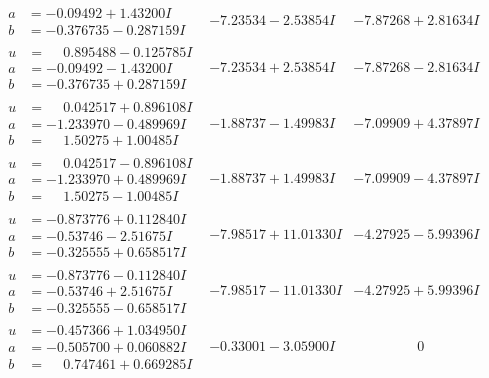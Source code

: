 \documentclass[1p]{elsarticle_modified}
\theoremstyle{definition}
\begin{document}
$$\begin{array}{c|c|c}
\begin{aligned}
a &= -0.09492 + 1.43200 I \\
b &= -0.376735 - 0.287159 I\end{aligned}
 & -7.23534 - 2.53854 I & -7.87268 + 2.81634 I \\ \hline\begin{aligned}
u &= \phantom{-}0.895488 - 0.125785 I \\
a &= -0.09492 - 1.43200 I \\
b &= -0.376735 + 0.287159 I\end{aligned}
 & -7.23534 + 2.53854 I & -7.87268 - 2.81634 I \\ \hline\begin{aligned}
u &= \phantom{-}0.042517 + 0.896108 I \\
a &= -1.233970 - 0.489969 I \\
b &= \phantom{-}1.50275 + 1.00485 I\end{aligned}
 & -1.88737 - 1.49983 I & -7.09909 + 4.37897 I \\ \hline\begin{aligned}
u &= \phantom{-}0.042517 - 0.896108 I \\
a &= -1.233970 + 0.489969 I \\
b &= \phantom{-}1.50275 - 1.00485 I\end{aligned}
 & -1.88737 + 1.49983 I & -7.09909 - 4.37897 I \\ \hline\begin{aligned}
u &= -0.873776 + 0.112840 I \\
a &= -0.53746 - 2.51675 I \\
b &= -0.325555 + 0.658517 I\end{aligned}
 & -7.98517 + 11.01330 I & -4.27925 - 5.99396 I \\ \hline\begin{aligned}
u &= -0.873776 - 0.112840 I \\
a &= -0.53746 + 2.51675 I \\
b &= -0.325555 - 0.658517 I\end{aligned}
 & -7.98517 - 11.01330 I & -4.27925 + 5.99396 I \\ \hline\begin{aligned}
u &= -0.457366 + 1.034950 I \\
a &= -0.505700 + 0.060882 I \\
b &= \phantom{-}0.747461 + 0.669285 I\end{aligned}
 & -0.33001 - 3.05900 I & \phantom{-0.000000 } 0 \\ \hline\begin{aligned}

\end{aligned}
\end{array}$$
\end{document}
